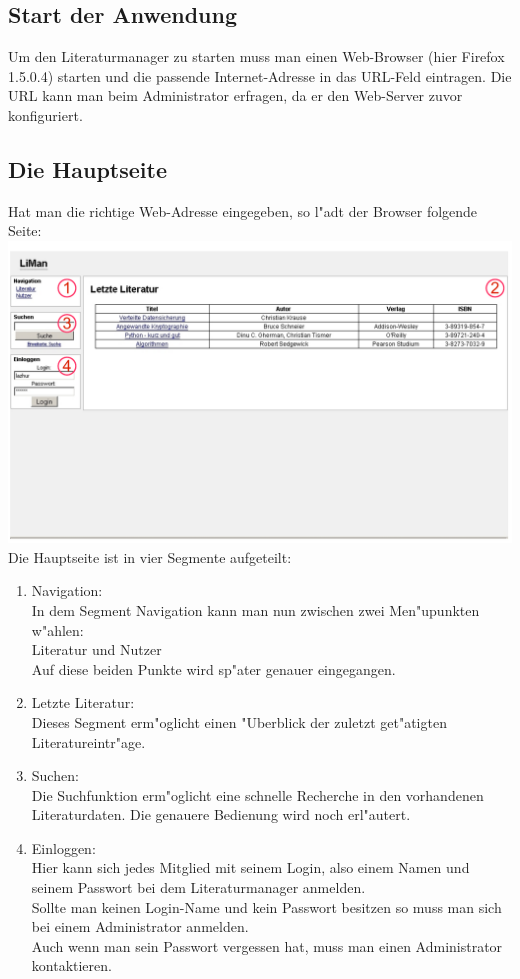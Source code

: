 \subsection{Start der Anwendung}
Um den Literaturmanager zu starten muss man einen Web-Browser (hier Firefox 1.5.0.4) starten und die passende Internet-Adresse in das URL-Feld eintragen. Die URL kann man beim Administrator erfragen, da er den Web-Server zuvor konfiguriert.
\subsection{Die Hauptseite}
Hat man die richtige Web-Adresse eingegeben, so l"adt der Browser folgende Seite:\\
\includegraphics[scale=0.8]{screen1}\\
Die Hauptseite ist in vier Segmente aufgeteilt:\\
\begin{enumerate}
\item Navigation:\\
In dem Segment Navigation kann man nun zwischen zwei Men"upunkten w"ahlen:\\
Literatur und Nutzer\\
Auf diese beiden Punkte wird sp"ater genauer eingegangen.
\item Letzte Literatur:\\
Dieses Segment erm"oglicht einen "Uberblick der zuletzt get"atigten Literatureintr"age.
\item Suchen:\\
Die Suchfunktion erm"oglicht eine schnelle Recherche in den vorhandenen Literaturdaten. Die genauere Bedienung wird noch erl"autert.
\item Einloggen:\\
Hier kann sich jedes Mitglied mit seinem Login, also einem Namen und seinem Passwort bei dem Literaturmanager anmelden.\\
Sollte man keinen Login-Name und kein Passwort besitzen so muss man sich bei einem Administrator anmelden.\\
Auch wenn man sein Passwort vergessen hat, muss man einen Administrator kontaktieren.\\
\end{enumerate}
